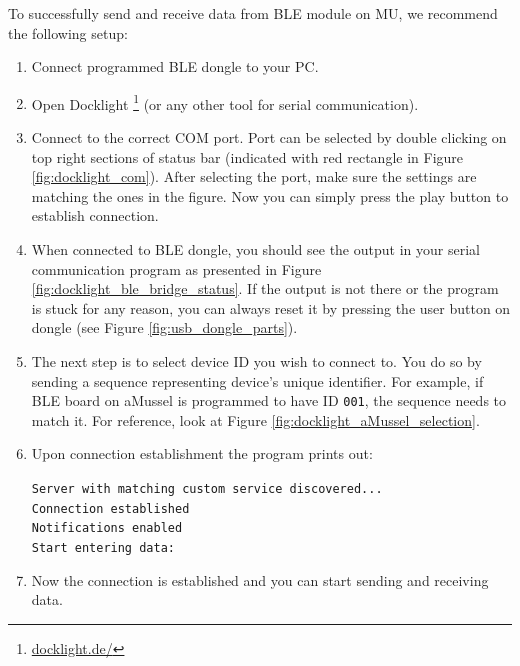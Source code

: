 To successfully send and receive data from BLE module on MU, we recommend the following setup:
\begin{enumerate}
	\item Connect programmed BLE dongle to your PC.
	\item Open Docklight \footnote{\url{docklight.de/}} (or any other tool for serial communication).
	\item Connect to the correct COM port. Port can be selected by double clicking on top right sections of status bar (indicated with red rectangle in Figure \ref{fig:docklight_com}). After selecting the port, make sure the settings are matching the ones in the figure. Now you can simply press the play button to establish connection.
	\item When connected to BLE dongle, you should see the output in your serial communication program as presented in Figure \ref{fig:docklight_ble_bridge_status}. If the output is not there or the program is stuck for any reason, you can always reset it by pressing the user button on dongle (see Figure \ref{fig:usb_dongle_parts}).
	\item The next step is to select device ID you wish to connect to. You do so by sending a sequence representing device's unique identifier. For example, if BLE board on aMussel is programmed to have ID \texttt{001}, the sequence needs to match it. For reference, look at Figure \ref{fig:docklight_aMussel_selection}.
	\item Upon connection establishment the program prints out: \\
	\hspace{10pt}\parbox[t]{\linewidth}{\texttt{Server with matching custom service discovered... \\
		Connection established \\
		Notifications enabled \\
		Start entering data:
	}}
	\item Now the connection is established and you can start sending and receiving data.
\end{enumerate}
